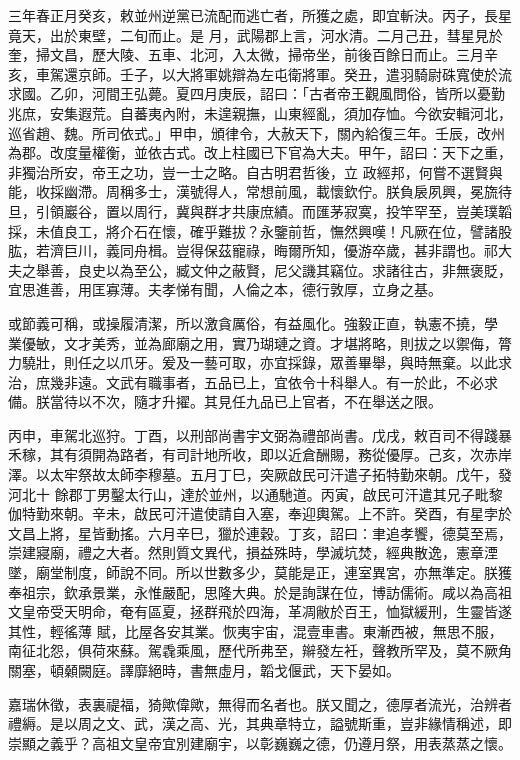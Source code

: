 \begin{pinyinscope}
 三年春正月癸亥，敕並州逆黨已流配而逃亡者，所獲之處，即宜斬決。丙子，長星竟天，出於東壁，二旬而止。是
 月，武陽郡上言，河水清。二月己丑，彗星見於奎，掃文昌，歷大陵、五車、北河，入太微，掃帝坐，前後百餘日而止。三月辛亥，車駕還京師。壬子，以大將軍姚辯為左屯衛將軍。癸丑，遣羽騎尉硃寬使於流求國。乙卯，河間王弘薨。夏四月庚辰，詔曰：「古者帝王觀風問俗，皆所以憂勤兆庶，安集遐荒。自蕃夷內附，未遑親撫，山東經亂，須加存恤。今欲安輯河北，巡省趙、魏。所司依式。」甲申，頒律令，大赦天下，關內給復三年。壬辰，改州為郡。改度量權衡，並依古式。改上柱國已下官為大夫。甲午，詔曰：天下之重，非獨治所安，帝王之功，豈一士之略。自古明君哲後，立
 政經邦，何嘗不選賢與能，收採幽滯。周稱多士，漢號得人，常想前風，載懷欽佇。朕負扆夙興，冕旒待旦，引領巖谷，置以周行，冀與群才共康庶績。而匯茅寂寞，投竿罕至，豈美璞韜採，未值良工，將介石在懷，確乎難拔？永鑒前哲，憮然興嘆！凡厥在位，譬諸股肱，若濟巨川，義同舟楫。豈得保茲寵祿，晦爾所知，優游卒歲，甚非謂也。祁大夫之舉善，良史以為至公，臧文仲之蔽賢，尼父譏其竊位。求諸往古，非無褒貶，宜思進善，用匡寡薄。夫孝悌有聞，人倫之本，德行敦厚，立身之基。



 或節義可稱，或操履清潔，所以激貪厲俗，有益風化。強毅正直，執憲不撓，學
 業優敏，文才美秀，並為廊廟之用，實乃瑚璉之資。才堪將略，則拔之以禦侮，膂力驍壯，則任之以爪牙。爰及一藝可取，亦宜採錄，眾善畢舉，與時無棄。以此求治，庶幾非遠。文武有職事者，五品已上，宜依令十科舉人。有一於此，不必求備。朕當待以不次，隨才升擢。其見任九品已上官者，不在舉送之限。



 丙申，車駕北巡狩。丁酉，以刑部尚書宇文弼為禮部尚書。戊戌，敕百司不得踐暴禾稼，其有須開為路者，有司計地所收，即以近倉酬賜，務從優厚。己亥，次赤岸澤。以太牢祭故太師李穆墓。五月丁巳，突厥啟民可汗遣子拓特勤來朝。戊午，發河北十
 餘郡丁男鑿太行山，達於並州，以通馳道。丙寅，啟民可汗遣其兄子毗黎伽特勤來朝。辛未，啟民可汗遣使請自入塞，奉迎輿駕。上不許。癸酉，有星孛於文昌上將，星皆動搖。六月辛巳，獵於連穀。丁亥，詔曰：聿追孝饗，德莫至焉，崇建寢廟，禮之大者。然則質文異代，損益殊時，學滅坑焚，經典散逸，憲章湮墜，廟堂制度，師說不同。所以世數多少，莫能是正，連室異宮，亦無準定。朕獲奉祖宗，欽承景業，永惟嚴配，思隆大典。於是詢謀在位，博訪儒術。咸以為高祖文皇帝受天明命，奄有區夏，拯群飛於四海，革凋敝於百王，恤獄緩刑，生靈皆遂其性，輕徭薄
 賦，比屋各安其業。恢夷宇宙，混壹車書。東漸西被，無思不服，南征北怨，俱荷來蘇。駕毳乘風，歷代所弗至，辮發左衽，聲教所罕及，莫不厥角關塞，頓顙闕庭。譯靡絕時，書無虛月，韜戈偃武，天下晏如。



 嘉瑞休徵，表裏禔福，猗歟偉歟，無得而名者也。朕又聞之，德厚者流光，治辨者禮縟。是以周之文、武，漢之高、光，其典章特立，謚號斯重，豈非緣情稱述，即崇顯之義乎？高祖文皇帝宜別建廟宇，以彰巍巍之德，仍遵月祭，用表蒸蒸之懷。




\end{pinyinscope}
